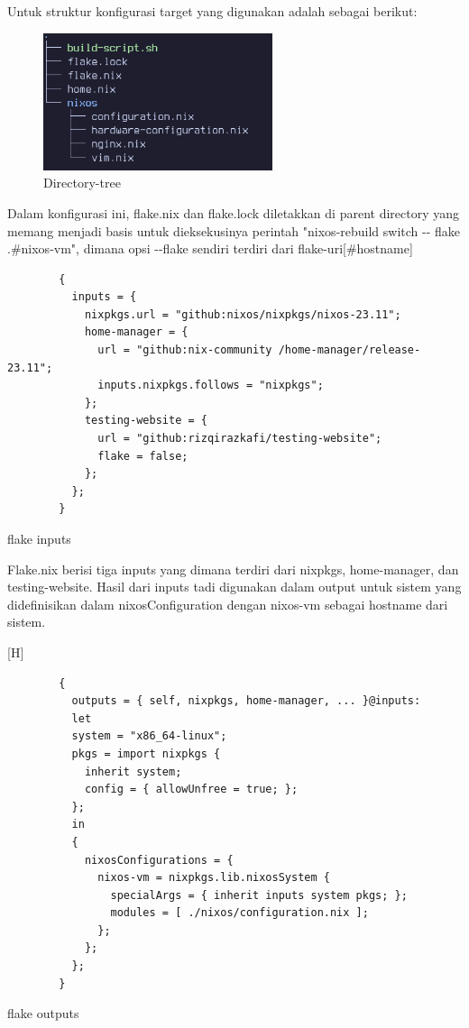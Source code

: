\documentclass[10pt,twoside]{report}
\newenvironment{code}{\captionsetup{type=listing}}{\vspace{3mm}}
\begin{document}
\begin{adjustwidth}{20pt}{}
\begin{adjustwidth}{20pt}{}
		Untuk struktur konfigurasi target yang digunakan adalah sebagai berikut:
		\begin{figure}[H]
			\centering
			\includegraphics[width=0.6\textwidth]{images/nix-tree.png}
			\caption{Directory-tree}
		\end{figure}

		Dalam konfigurasi ini, flake.nix dan flake.lock diletakkan di parent
		directory yang memang menjadi basis untuk dieksekusinya perintah
		"nixos-rebuild switch -{}- flake .\#nixos-vm", dimana opsi -{}-flake sendiri
		terdiri dari flake-uri[\#hostname]

		\begin{code}
			\begin{verbatim}
        {
          inputs = {
            nixpkgs.url = "github:nixos/nixpkgs/nixos-23.11";
            home-manager = {
              url = "github:nix-community /home-manager/release-23.11";
              inputs.nixpkgs.follows = "nixpkgs";
            };
            testing-website = {
              url = "github:rizqirazkafi/testing-website";
              flake = false;
            };
          };
        }
      \end{verbatim}
			\caption{flake inputs}
		\end{code}

		Flake.nix berisi tiga inputs yang dimana terdiri dari nixpkgs, home-manager,
		dan testing-website. Hasil dari inputs tadi digunakan dalam output untuk
		sistem yang didefinisikan dalam nixosConfiguration dengan nixos-vm sebagai
		hostname dari sistem.

		\begin{code}[H]
			\begin{verbatim}
        {
          outputs = { self, nixpkgs, home-manager, ... }@inputs:
          let
          system = "x86_64-linux";
          pkgs = import nixpkgs {
            inherit system;
            config = { allowUnfree = true; };
          };
          in
          {
            nixosConfigurations = {
              nixos-vm = nixpkgs.lib.nixosSystem {
                specialArgs = { inherit inputs system pkgs; };
                modules = [ ./nixos/configuration.nix ];
              };
            };
          };
        }
      \end{verbatim}
			\caption{flake outputs}
		\end{code}


\end{adjustwidth}
\end{adjustwidth}
\end{document}
